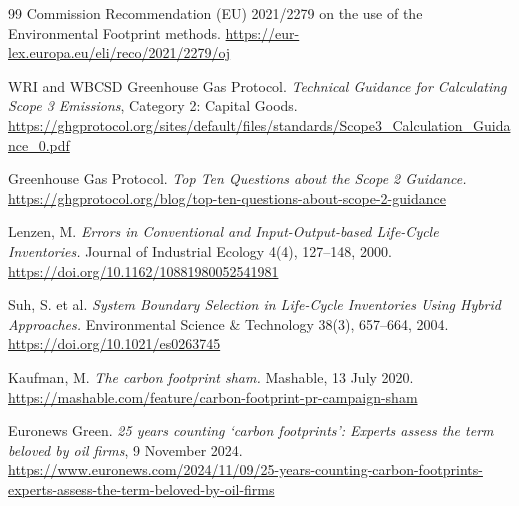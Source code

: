\documentclass[11pt,a4paper]{article}
\begin{document}
\begin{thebibliography}{99}
 Commission Recommendation (EU) 2021/2279 on the use of the Environmental Footprint methods. \url{https://eur-lex.europa.eu/eli/reco/2021/2279/oj}

 WRI and WBCSD Greenhouse Gas Protocol. \emph{Technical Guidance for Calculating Scope 3 Emissions}, Category 2: Capital Goods. \url{https://ghgprotocol.org/sites/default/files/standards/Scope3_Calculation_Guidance_0.pdf}

 Greenhouse Gas Protocol. \emph{Top Ten Questions about the Scope 2 Guidance.} \url{https://ghgprotocol.org/blog/top-ten-questions-about-scope-2-guidance}

 Lenzen, M. \emph{Errors in Conventional and Input-Output-based Life-Cycle Inventories.} Journal of Industrial Ecology 4(4), 127--148, 2000. \url{https://doi.org/10.1162/10881980052541981}

 Suh, S. et al. \emph{System Boundary Selection in Life-Cycle Inventories Using Hybrid Approaches.} Environmental Science \& Technology 38(3), 657--664, 2004. \url{https://doi.org/10.1021/es0263745}

 Kaufman, M. \emph{The carbon footprint sham.} Mashable, 13 July 2020. \url{https://mashable.com/feature/carbon-footprint-pr-campaign-sham}

 Euronews Green. \emph{25 years counting `carbon footprints': Experts assess the term beloved by oil firms}, 9 November 2024. \url{https://www.euronews.com/2024/11/09/25-years-counting-carbon-footprints-experts-assess-the-term-beloved-by-oil-firms}

\end{thebibliography}
\end{document}
